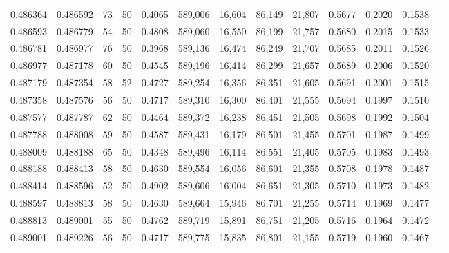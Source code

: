 \begin{tabular}{rrrrrrrrrrrrr}
0.486364 & 0.486592 &    73 &  50 &                                     0.4065 & 589,006 &  16,604 &  86,149 &  21,807 & 0.5677 & 0.2020 & 0.1538 \\
0.486593 & 0.486779 &    54 &  50 &                                     0.4808 & 589,060 &  16,550 &  86,199 &  21,757 & 0.5680 & 0.2015 & 0.1533 \\
0.486781 & 0.486977 &    76 &  50 &                                     0.3968 & 589,136 &  16,474 &  86,249 &  21,707 & 0.5685 & 0.2011 & 0.1526 \\
0.486977 & 0.487178 &    60 &  50 &                                     0.4545 & 589,196 &  16,414 &  86,299 &  21,657 & 0.5689 & 0.2006 & 0.1520 \\
0.487179 & 0.487354 &    58 &  52 &                                     0.4727 & 589,254 &  16,356 &  86,351 &  21,605 & 0.5691 & 0.2001 & 0.1515 \\
0.487358 & 0.487576 &    56 &  50 &                                     0.4717 & 589,310 &  16,300 &  86,401 &  21,555 & 0.5694 & 0.1997 & 0.1510 \\
0.487577 & 0.487787 &    62 &  50 &                                     0.4464 & 589,372 &  16,238 &  86,451 &  21,505 & 0.5698 & 0.1992 & 0.1504 \\
0.487788 & 0.488008 &    59 &  50 &                                     0.4587 & 589,431 &  16,179 &  86,501 &  21,455 & 0.5701 & 0.1987 & 0.1499 \\
0.488009 & 0.488188 &    65 &  50 &                                     0.4348 & 589,496 &  16,114 &  86,551 &  21,405 & 0.5705 & 0.1983 & 0.1493 \\
0.488188 & 0.488413 &    58 &  50 &                                     0.4630 & 589,554 &  16,056 &  86,601 &  21,355 & 0.5708 & 0.1978 & 0.1487 \\
0.488414 & 0.488596 &    52 &  50 &                                     0.4902 & 589,606 &  16,004 &  86,651 &  21,305 & 0.5710 & 0.1973 & 0.1482 \\
0.488597 & 0.488813 &    58 &  50 &                                     0.4630 & 589,664 &  15,946 &  86,701 &  21,255 & 0.5714 & 0.1969 & 0.1477 \\
0.488813 & 0.489001 &    55 &  50 &                                     0.4762 & 589,719 &  15,891 &  86,751 &  21,205 & 0.5716 & 0.1964 & 0.1472 \\
0.489001 & 0.489226 &    56 &  50 &                                     0.4717 & 589,775 &  15,835 &  86,801 &  21,155 & 0.5719 & 0.1960 & 0.1467 \\

\end{tabular}
